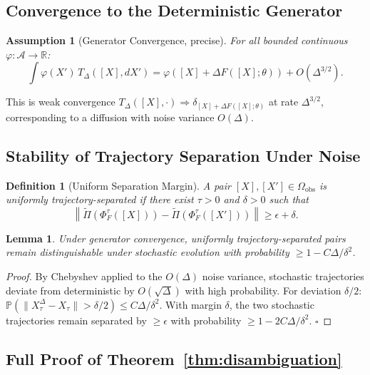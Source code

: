 \documentclass[11pt, oneside]{article}
\newtheorem{lemma}[theorem]{Lemma}
\newtheorem{definition}[theorem]{Definition}
\newtheorem{assumption}[theorem]{Assumption}
\newcommand{\Ftil}{\widetilde{\Pi}}
\begin{document}
\subsection{Convergence to the Deterministic Generator}

\begin{assumption}[Generator Convergence, precise]
For all bounded continuous $\varphi : \mathcal{A} \to \mathbb{R}$:
\[
\int \varphi(X')\,T_\Delta([X],dX') = \varphi([X] + \Delta F([X];\theta)) + O(\Delta^{3/2}).
\]
\end{assumption}

This is weak convergence $T_\Delta([X],\cdot) \Rightarrow \delta_{[X]+\Delta F([X];\theta)}$
at rate $\Delta^{3/2}$, corresponding to a diffusion with noise variance $O(\Delta)$.

\subsection{Stability of Trajectory Separation Under Noise}

\begin{definition}[Uniform Separation Margin]
A pair $[X],[X'] \in \Omega_{\mathrm{obs}}$ is \emph{uniformly trajectory-separated} if
there exist $\tau > 0$ and $\delta > 0$ such that
\[
\left\| \Ftil(\Phi^\tau_F([X])) - \Ftil(\Phi^\tau_F([X'])) \right\| \ge \epsilon + \delta.
\]
\end{definition}

\begin{lemma}
Under generator convergence, uniformly trajectory-separated pairs remain distinguishable
under stochastic evolution with probability $\ge 1 - C\Delta/\delta^2$.
\end{lemma}
\begin{proof}
By Chebyshev applied to the $O(\Delta)$ noise variance, stochastic trajectories deviate
from deterministic by $O(\sqrt{\Delta})$ with high probability. For deviation $\delta/2$:
$\mathbb{P}(\|X_\tau^\Delta - X_\tau\| > \delta/2) \le C\Delta/\delta^2$.
With margin $\delta$, the two stochastic trajectories remain separated by $\ge \epsilon$
with probability $\ge 1 - 2C\Delta/\delta^2$. $\square$
\end{proof}

\subsection{Full Proof of Theorem~\ref{thm:disambiguation}}
\end{document}
